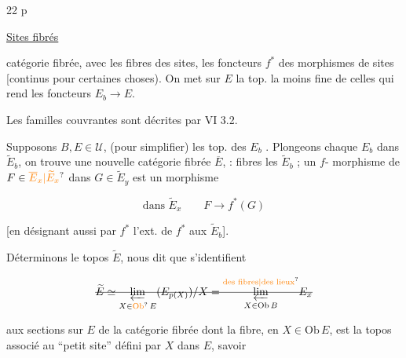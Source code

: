 
22 p


\uline{Sites fibrés}


catégorie fibrée, avec les   fibres
des sites, les foncteurs $f^*$ des morphismes
de sites [continus  pour certaines
choses). On met sur $E$ la top. la moins fine de
celles qui rend  les foncteurs $E_b\longrightarrow E$.

Les familles couvrantes sont décrites par VI 3.2.

Supposons $B,E\in\mathcal U$,  (pour simplifier) les
top. des $E_b$ . Plongeons chaque
$E_b$ dans $\widetilde E_b$, on trouve une nouvelle catégorie
fibrée $\overline E$, : fibres les  $\widetilde E_b$ ; un $f$- morphisme de
$F\in\unsure{\overline E_x|\widetilde E_x}$ dans $G\in\widetilde E_y$ est un morphisme


\[
\text{dans }\widetilde E_x \qquad F\longrightarrow f^*(G)
\]

[en désignant aussi par $f^*$ l'ext.
de $f^*$ aux $\widetilde E_b$].

Déterminons le topos $\widetilde E$,  
 nous dit que    s'identifient

\[
\deleted{\widetilde E\simeq \underset{X\in\unsure{\mathrm{Ob}}\,E}{\underleftarrow{\lim}}
(E_{p(X)})/X = \overset{\text{\unsure{des fibres|des lieux}}}{\underset{X\in\mathrm{Ob}\, B}{\underleftarrow{\lim}}}E_x}
\]

 \unsure{,}
aux sections sur $E$ de la catégorie fibrée dont
la fibre, en $X\in\mathrm{Ob}\,E$, est la   topos
associé au ``petit site'' défini par $X$ dans $E$, savoir



